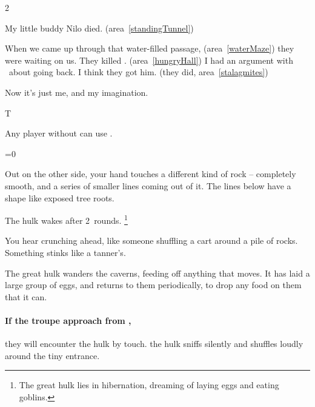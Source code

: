 \begin{multicols}{2}
\begin{boxtext}[]
\begin{speechtext}
    My little buddy Nilo died.
    {\sffamily\upshape(\gls{area}~\ref{standingTunnel})}

    When we came up through that water-filled passage,
    {\sffamily\upshape(\gls{area}~\ref{waterMaze})}
    they were waiting on us.
    They killed \composeHumanName.
    {\sffamily\upshape(\gls{area}~\ref{hungryHall})}
    I had an argument with \composeHumanName\ about going back.
    I think they got him.
    {\sffamily\upshape(they did, \gls{area}~\vref{stalagmites})}

    Now it's just me, and my imagination.
  \end{speechtext}
\end{boxtext}

\begin{minipage}{.1\linewidth}
  \Huge\gls{T}
\end{minipage}
Any player without  can use \scaredFodder.

\renewcommand\rations{pebbles}
\lostGuard



\ifnum\value{temperature}=0%

  \begin{boxtext}
    Out on the other side, your hand touches a different kind of rock -- completely smooth, and a series of smaller lines coming out of it.
    The lines below have a shape like exposed tree roots.
  \end{boxtext}

  The \gls{hulk} wakes after 2~\glspl{round}.%
  \footnote{The great \gls{hulk} lies in hibernation, dreaming of laying eggs and eating goblins.}
\else%

  \begin{boxtext}
    You hear crunching ahead, like someone shuffling a cart around a pile of rocks.
    Something stinks like a tanner's.
  \end{boxtext}

  The great \gls{hulk} wanders the caverns, feeding off anything that moves.
    It has laid a large group of eggs, and returns to them periodically, to drop any food on them that it can.
\fi%

\paragraph{If the troupe approach from ,}
\ifnum{}%
  they will encounter the \gls{hulk} by touch.
\else%
  the \gls{hulk} sniffs silently and shuffles loudly around the tiny entrance.
\fi%


\end{multicols}
